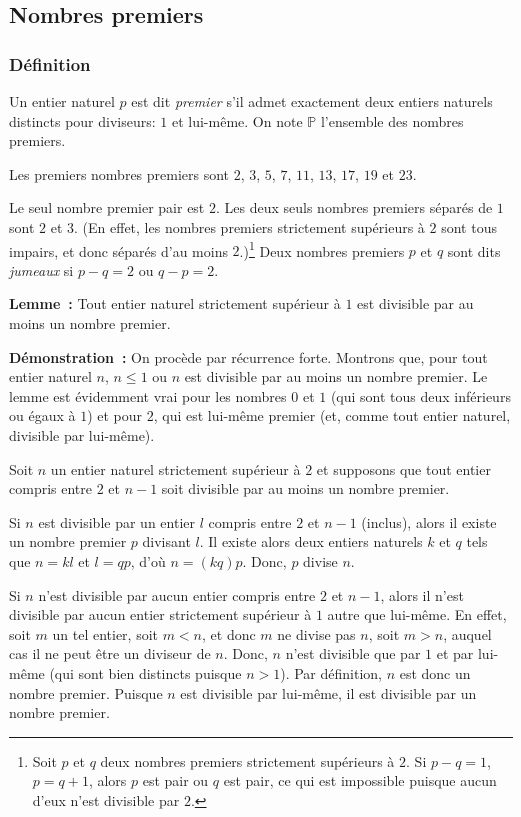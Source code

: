 \subsection{Nombres premiers}

\subsubsection{Définition}
\label{subsub:defNombresPremiers}

Un entier naturel $p$ est dit \textit{premier} s'il admet exactement deux entiers naturels distincts pour diviseurs: $1$ et lui-même.
On note $\mathbb{P}$ l'ensemble des nombres premiers.

Les premiers nombres premiers sont $2$, $3$, $5$, $7$, $11$, $13$, $17$, $19$ et $23$.

Le seul nombre premier pair est $2$. 
Les deux seuls nombres premiers séparés de $1$ sont $2$ et $3$. 
(En effet, les nombres premiers strictement supérieurs à $2$ sont tous impairs, et donc séparés d'au moins $2$.)\footnote{Soit $p$ et $q$ deux nombres premiers strictement supérieurs à $2$. Si $p-q=1$, $p=q+1$, alors $p$ est pair ou $q$ est pair, ce qui est impossible puisque aucun d'eux n'est divisible par $2$.}
Deux nombres premiers $p$ et $q$ sont dits \textit{jumeaux} si $p-q=2$ ou $q-p=2$. 

\bigskip

\noindent\textbf{Lemme :} Tout entier naturel strictement supérieur à $1$ est divisible par au moins un nombre premier.

\medskip

\noindent\textbf{Démonstration :} On procède par récurrence forte. 
Montrons que, pour tout entier naturel $n$, $n \leq 1$ ou $n$ est divisible par au moins un nombre premier.
Le lemme est évidemment vrai pour les nombres $0$ et $1$ (qui sont tous deux inférieurs ou égaux à $1$) et pour $2$, qui est lui-même premier (et, comme tout entier naturel, divisible par lui-même). 

Soit $n$ un entier naturel strictement supérieur à $2$ et supposons que tout entier compris entre $2$ et $n-1$ soit divisible par au moins un nombre premier. 

Si $n$ est divisible par un entier $l$ compris entre $2$ et $n-1$ (inclus), alors il existe un nombre premier $p$ divisant $l$. 
Il existe alors deux entiers naturels $k$ et $q$ tels que $n = k l$ et $l = q p$, d'où $n = (k q) p$. 
Donc, $p$ divise $n$. 

Si $n$ n'est divisible par aucun entier compris entre $2$ et $n-1$, alors il n'est divisible par aucun entier strictement supérieur à $1$ autre que lui-même. 
En effet, soit $m$ un tel entier, soit $m < n$, et donc $m$ ne divise pas $n$, soit $m > n$, auquel cas il ne peut être un diviseur de $n$.
Donc, $n$ n'est divisible que par $1$ et par lui-même (qui sont bien distincts puisque $n > 1$). 
Par définition, $n$ est donc un nombre premier. 
Puisque $n$ est divisible par lui-même, il est divisible par un nombre premier. 

